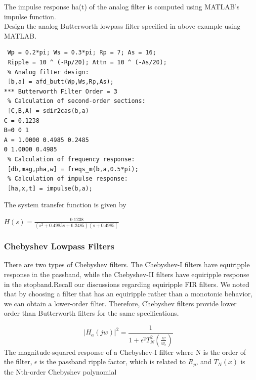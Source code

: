\documentclass{article}
\begin{document}
The impulse response ha(t) of the analog filter is computed using
MATLAB's impulse function. \\
\vspace{1em}
\newpage
Design the analog Butterworth lowpass filter specified in above example using
MATLAB.
\begin{lstlisting}
 Wp = 0.2*pi; Ws = 0.3*pi; Rp = 7; As = 16;
 Ripple = 10 ^ (-Rp/20); Attn = 10 ^ (-As/20);
 % Analog filter design:
 [b,a] = afd_butt(Wp,Ws,Rp,As);
*** Butterworth Filter Order = 3
 % Calculation of second-order sections:
 [C,B,A] = sdir2cas(b,a)
C = 0.1238
B=0 0 1
A = 1.0000 0.4985 0.2485
0 1.0000 0.4985
 % Calculation of frequency response:
 [db,mag,pha,w] = freqs_m(b,a,0.5*pi);
 % Calculation of impulse response:
 [ha,x,t] = impulse(b,a);    
\end{lstlisting}
The system transfer function is given by 
\begin{center}
$H(s) = \frac{0.1238}{(s^2+0.4985s+0.2485)(s+0.4985)}$
\end{center}
\subsubsection{Chebyshev Lowpass Filters}
There are two types of Chebyshev filters. The Chebyshev-I filters have
equiripple response in the passband, while the Chebyshev-II filters have
equiripple response in the stopband.Recall our discussions regarding equiripple FIR filters. We noted that by choosing a filter that has an equiripple rather than a monotonic behavior, we can obtain a lower-order filter. Therefore, Chebyshev filters provide lower order than Butterworth filters for the same specifications.

\begin{equation}
|H_a(jw)|^2=\frac{1}{1+\epsilon^2{T_N^2}(\frac{w}{w_c})}
\end{equation}
The magnitude-squared response of a Chebyshev-I filter where N is the order of the filter, $\epsilon$ is the passband ripple factor, which is
related to $R_p$, and $T_N(x)$ is the Nth-order Chebyshev polynomial 
\end{document}
